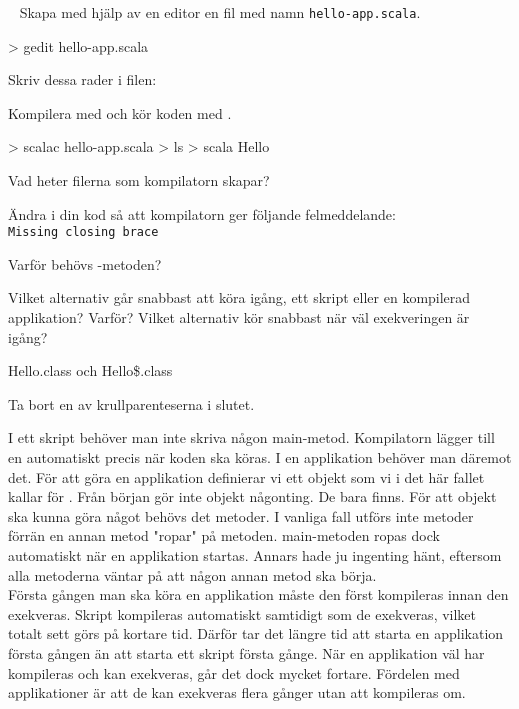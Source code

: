 \QUESTEND









\QUESTBEGIN

\Task  \what~  Skapa med hjälp av en editor en fil med namn \texttt{hello-app.scala}.
\begin{REPLnonum}
> gedit hello-app.scala
\end{REPLnonum}
Skriv dessa rader i filen:



\Subtask Kompilera med  och kör koden med .
\begin{REPLnonum}
> scalac hello-app.scala
> ls
> scala Hello
\end{REPLnonum}
Vad heter filerna som kompilatorn skapar?

\Subtask Ändra i din kod så att kompilatorn ger följande felmeddelande: \\
\texttt{Missing closing brace}

\Subtask\Pen Varför behövs -metoden?

\Subtask\Pen Vilket alternativ går snabbast att köra igång, ett skript eller en kompilerad applikation? Varför? Vilket alternativ kör snabbast när väl exekveringen är igång?


\SOLUTION


\TaskSolved \what
 

\SubtaskSolved  Hello.class och Hello\$.class

\SubtaskSolved  Ta bort en av krullparenteserna i slutet.

\SubtaskSolved  I ett skript behöver man inte skriva någon main-metod. Kompilatorn lägger till en automatiskt precis när koden ska köras. I en applikation behöver man däremot det. För att göra en applikation definierar vi ett objekt som vi i det här fallet kallar för . Från början gör inte objekt någonting. De bara finns. För att objekt ska kunna göra något behövs det metoder. I vanliga fall utförs inte metoder förrän en annan metod "ropar" på metoden. main-metoden ropas dock automatiskt när en applikation startas. Annars hade ju ingenting hänt, eftersom alla metoderna väntar på att någon annan metod ska börja. \\
\SubtaskSolved  Första gången man ska köra en applikation måste den först kompileras innan den exekveras. Skript kompileras automatiskt samtidigt som de exekveras, vilket totalt sett görs på kortare tid. Därför tar det längre tid att starta en applikation första gången än att starta ett skript första gånge. När en applikation väl har kompileras och kan exekveras, går det dock mycket fortare. Fördelen med applikationer är att de kan exekveras flera gånger utan att kompileras om.




